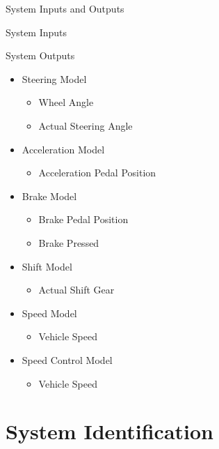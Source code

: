 \documentclass{beamer}
\begin{document}
\begin{frame}{System Inputs and Outputs}
\begin{minipage}[t]{0.48\linewidth}
\begin{block}{System Inputs}
	\end{block}
\end{minipage}%
\hfill%
\begin{minipage}[t]{0.48\linewidth}
\begin{block}{System Outputs}
		\begin{itemize}
			\tiny
		    \item Steering Model
		    \begin{itemize}
		    \tiny
		    		\item Wheel Angle
		    		\item Actual Steering Angle
		    \end{itemize}
		    \item Acceleration Model
		    \begin{itemize}
		    \tiny
		    		\item Acceleration Pedal Position
		    \end{itemize}
		    \item Brake Model
		    \begin{itemize}
		    \tiny
		    		\item Brake Pedal Position
		    		\item Brake Pressed
		    \end{itemize}
		    \item Shift Model
		    \begin{itemize}
		    \tiny
		    		\item Actual Shift Gear
		    \end{itemize}
		    \item Speed Model
		    \begin{itemize}
		    \tiny
		    		\item Vehicle Speed
		    \end{itemize}
		    \item Speed Control Model
		    \begin{itemize}
		    \tiny
		    		\item Vehicle Speed
		    \end{itemize}
		\end{itemize}
	\end{block}
\end{minipage}
\end{frame}


\section{System Identification}
\end{document}
